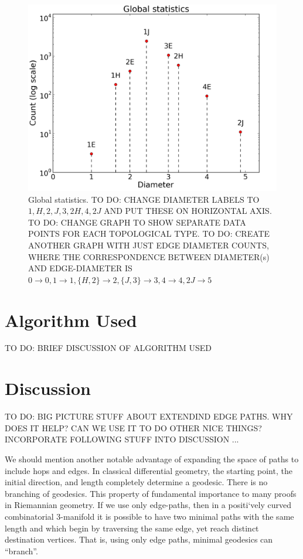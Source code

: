 \documentclass[12pt]{article}
\begin{document}
\begin{figure}
    \begin{center}
    \includegraphics[width=0.9\linewidth]{figures/global_statistics.png}
    \caption{Global statistics. TO DO: CHANGE DIAMETER LABELS TO $1, H, 2, J, 3, 2H, 4, 2J$ AND PUT THESE ON HORIZONTAL AXIS. TO DO: CHANGE GRAPH TO SHOW SEPARATE DATA POINTS FOR EACH TOPOLOGICAL TYPE. TO DO: CREATE ANOTHER GRAPH WITH JUST EDGE DIAMETER COUNTS, WHERE THE CORRESPONDENCE BETWEEN DIAMETER(s) AND EDGE-DIAMETER IS $0\rightarrow 0, 1\rightarrow 1, \{H, 2\}\rightarrow 2, \{J,3\}\rightarrow 3, 4\rightarrow 4, 2J\rightarrow 5$}
    \end{center}
    \label{global_statistics}
\end{figure}


\section{Algorithm Used}

TO DO: BRIEF DISCUSSION OF ALGORITHM USED

\section{Discussion}

TO DO: BIG PICTURE STUFF ABOUT EXTENDIND EDGE PATHS. WHY DOES IT HELP? CAN WE USE IT TO DO OTHER NICE THINGS? INCORPORATE FOLLOWING STUFF INTO DISCUSSION ...

We should mention another notable advantage of expanding the space of paths to include hops and edges. In classical differential geometry, the starting point, the initial direction, and length completely determine a geodesic. There is no branching of geodesics. This property of fundamental importance to many proofs in Riemannian geometry. If we use only edge-paths, then in a positi`vely curved combinatorial 3-manifold it is possible to have two minimal paths with the same length and which begin by traversing the same edge, yet reach distinct destination vertices. That is, using only edge paths, minimal geodesics can ``branch''.
\end{document}
